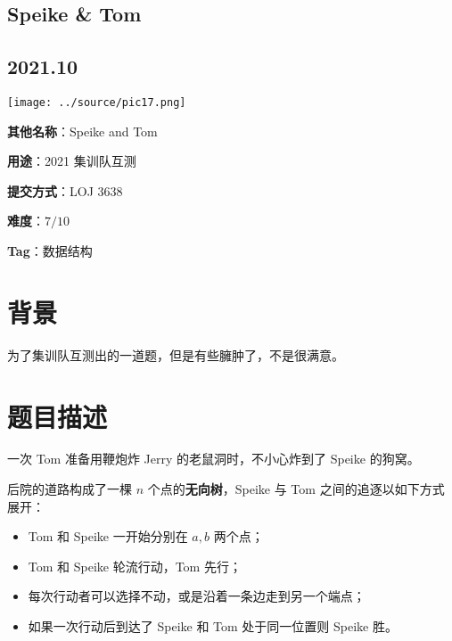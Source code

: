 \documentclass[a4paper,10pt]{article}
\begin{document}
\vspace*{\fill}
\begin{center}

\section{Speike \& Tom}

\subsection*{2021.10}

\vspace{10pt}

\texttt{[image: ../source/pic17.png]}

\vspace{10pt}

\textbf{其他名称}：Speike and Tom

\vspace{10pt}

\textbf{用途}：2021 集训队互测

\vspace{10pt}

\textbf{提交方式}：LOJ 3638

\vspace{10pt}

\textbf{难度}：$7/10$

\vspace{10pt}

\textbf{Tag}：数据结构

\end{center}
\vspace*{\fill}

\newpage

\section*{背景}

为了集训队互测出的一道题，但是有些臃肿了，不是很满意。

\section*{题目描述}

一次 Tom 准备用鞭炮炸 Jerry 的老鼠洞时，不小心炸到了 Speike 的狗窝。

后院的道路构成了一棵 $n$ 个点的\textbf{无向树}，Speike 与 Tom 之间的追逐以如下方式展开：

\begin{itemize}
\item Tom 和 Speike 一开始分别在 $a,b$ 两个点；

\item Tom 和 Speike 轮流行动，Tom 先行；

\item 每次行动者可以选择不动，或是沿着一条边走到另一个端点；

\item 如果一次行动后到达了 Speike 和 Tom 处于同一位置则 Speike 胜。
\end{itemize}
\end{document}
